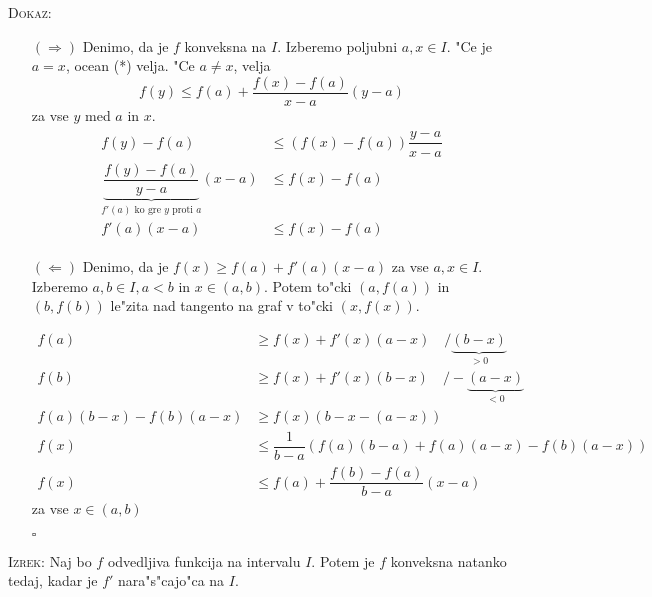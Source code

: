 \textsc{Dokaz:}
\begin{itemize}
	\item[$(\Rightarrow)$] Denimo, da je $f$ konveksna na $I$. Izberemo poljubni $a, x \in I$. "Ce je $a = x$, ocean (*) velja. "Ce $a \neq x$, velja
	\begin{equation*}
	f(y) \leq f(a) + \dfrac{f(x) - f(a)}{x-a} (y-a)
	\end{equation*}
	za vse $y$ med $a$ in $x$.
	\begin{gather*}
	\begin{aligned}
	f(y) - f(a) &\leq (f(x) - f(a)) \dfrac{y - a}{x - a} \\
	\underbrace{\dfrac{f(y) - f(a)}{y - a}}_{f'(a) \text{ ko gre $y$ proti $a$}} (x-a) &\leq f(x) - f(a) \\
	f'(a) (x - a) &\leq f(x) - f(a)
	\end{aligned}
	\end{gather*}
	
	\item[$(\Leftarrow)$] Denimo, da je $f(x) \geq f(a) + f'(a)(x-a)$ za vse $a, x \in I$. Izberemo $a, b \in I, a < b$ in $x \in (a, b)$. Potem to"cki $(a, f(a))$ in $(b, f(b))$ le"zita nad tangento na graf v to"cki $(x, f(x))$.
	
	\begin{align*}
	f(a) &\geq f(x) + f'(x) (a - x)  \quad / \underbrace{(b - x)}_{> 0} \\
	f(b) &\geq f(x) + f'(x) (b - x) \quad / - \underbrace{(a - x)}_{< 0} \\
	f(a) (b-x) - f(b) (a-x) &\geq f(x) (b-x - (a - x)) \\
	f(x) &\leq \dfrac{1}{b-a} (f(a) (b-a) + f(a) (a-x) - f(b) (a-x)) \\
	f(x) & \leq f(a) + \dfrac{f(b) - f(a)}{b-a} (x-a)
	\end{align*}
	za vse $x \in (a, b)$
	
	\hfill $\square$
\end{itemize}
%
\textsc{Izrek:} Naj bo $f$ odvedljiva funkcija na intervalu $I$. Potem je $f$ konveksna natanko tedaj, kadar je $f'$ nara"s"cajo"ca na $I$.

